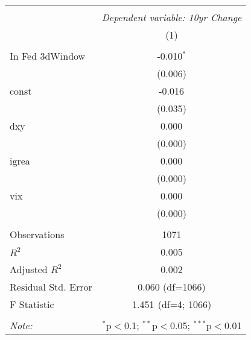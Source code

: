 \begin{table}[!htbp] \centering
\begin{tabular}{@{\extracolsep{5pt}}lc}
\\[-1.8ex]\hline
\hline \\[-1.8ex]
& \multicolumn{1}{c}{\textit{Dependent variable: 10yr Change}} \
\cr \cline{2-2}
\\[-1.8ex] & (1) \\
\hline \\[-1.8ex]
 In Fed 3dWindow & -0.010$^{*}$ \\
& (0.006) \\
 const & -0.016$^{}$ \\
& (0.035) \\
 dxy & 0.000$^{}$ \\
& (0.000) \\
 igrea & 0.000$^{}$ \\
& (0.000) \\
 vix & 0.000$^{}$ \\
& (0.000) \\
\hline \\[-1.8ex]
 Observations & 1071 \\
 $R^2$ & 0.005 \\
 Adjusted $R^2$ & 0.002 \\
 Residual Std. Error & 0.060 (df=1066) \\
 F Statistic & 1.451$^{}$ (df=4; 1066) \\
\hline
\hline \\[-1.8ex]
\textit{Note:} & \multicolumn{1}{r}{$^{*}$p$<$0.1; $^{**}$p$<$0.05; $^{***}$p$<$0.01} \\
\end{tabular}
\end{table}